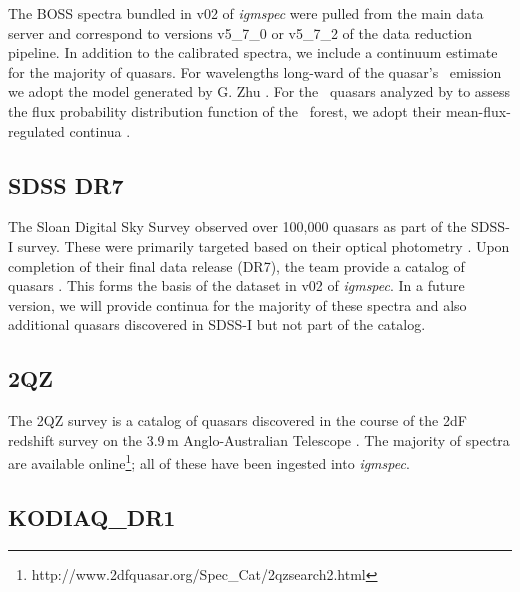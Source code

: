 \documentclass[12pt]{elsarticle}
\begin{document}
The BOSS spectra bundled in v02 of {\it igmspec} were pulled
from the main data server and correspond to versions 
v5\_7\_0 or v5\_7\_2 of the data reduction pipeline.
In addition to the calibrated spectra, we include a
continuum estimate for the majority of quasars.  
For wavelengths long-ward of the quasar's \lya\ emission we adopt
the model generated by G. Zhu 
\citep[see][for details on the algorithm]{zhu+14}.
For the \nlee~quasars analyzed by \cite{lee+13} to assess
the flux probability distribution function of the 
\lya\ forest, we adopt their mean-flux-regulated continua
\citep{lee+12}.

%
\subsection{SDSS DR7}
\label{sec:dr7}

The Sloan Digital Sky Survey observed over 100,000 quasars
as part of the SDSS-I survey.  These were primarily targeted
based on their optical photometry \citep[e.g.][]{richards09}.  
Upon completion of their final data release (DR7),
the team provide a catalog of quasars \citep{sdss_qso_dr7}.
This forms the basis of the dataset in v02 of {\it igmspec}.
In a future version, we will provide continua for the majority
of these spectra and also additional quasars discovered in 
SDSS-I but not part of the \cite{sdss_qso_dr7} catalog.



\subsection{2QZ}
\label{sec:2qz}

The 2QZ survey is a catalog of quasars discovered in the 
course of the 2dF redshift survey on the 3.9\,m
Anglo-Australian Telescope \citep{croom01}.  The
majority of spectra are available online\footnote{http://www.2dfquasar.org/Spec\_Cat/2qzsearch2.html};
all of these have been ingested into {\it igmspec}.


\subsection{KODIAQ\_DR1}
\label{sec:kodiaq}
\end{document}
